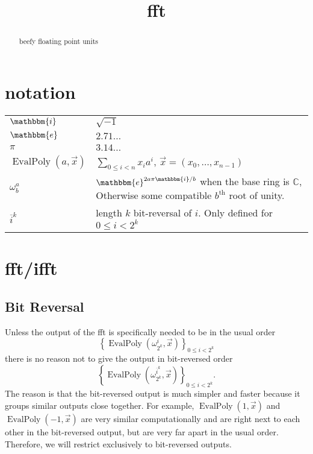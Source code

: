 \documentclass[12 pt]{amsart}
\newcommand{\om}[2] {\omega_{#1}^{#2}}
\newcommand{\ee}[0] {\mathbbm{e}}
\newcommand{\ii}[0] {\mathbbm{i}}
\begin{document}
\title{fft}
\maketitle

\begin{abstract}
beefy floating point units
\end{abstract}

\section{notation}

\begin{tabular}{l|l}
$\ii$ & $\sqrt{-1}$ \\
$\ee$ & $2.71\dots$ \\
$\pi$ & $3.14\dots$ \\
$\operatorname{EvalPoly}(a, \vec{x})$ & $\sum_{0 \le i < n} x_i a^i$, $\vec{x} = (x_0, \dots, x_{n-1})$\\
$\om{b}{a}$ & $\ee^{2 a \pi \ii / b}$ when the base ring is $\mathbb{C}$, 
Otherwise some compatible $b^{\text{th}}$ root of unity.\\
$\overline{i}^k$ & length $k$ bit-reversal of $i$. Only defined for $0 \le i < 2^k$\\
\end{tabular} 

\section{fft/ifft}

\subsection{Bit Reversal}

Unless the output of the fft is specifically needed to be in the usual order
\begin{equation*}
\left\{\operatorname{EvalPoly}(\om{2^k}{i}, \vec{x})\right\}_{0 \le i < 2^k}
\end{equation*}
there is no reason not to give the output in bit-reversed order
\begin{equation*}
\left\{\operatorname{EvalPoly}(\om{2^k}{\overline{i}^k}, \vec{x})\right\}_{0 \le i < 2^k}\text{.}
\end{equation*}
The reason is that the bit-reversed output is much simpler and faster because it
groups similar outputs close together. For example, $\operatorname{EvalPoly}(1, \vec{x})$ and
$\operatorname{EvalPoly}(-1, \vec{x})$ are very similar computationally and are right next to
each other in the bit-reversed output, but are very far apart in the usual order. Therefore,
we will restrict exclusively to bit-reversed outputs.
\end{document}
